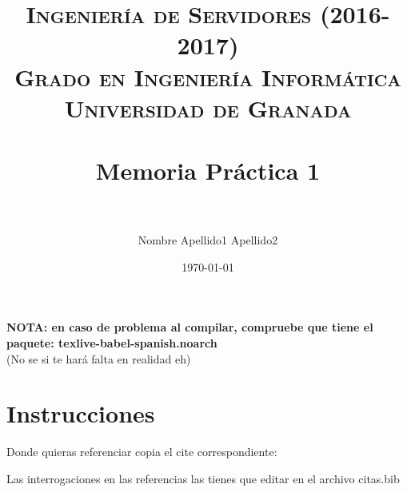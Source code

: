 


\title{	
\normalfont \normalsize 
\textsc{\textbf{Ingeniería de Servidores (2016-2017)} \\ Grado en Ingeniería Informática \\ Universidad de Granada} \\ [25pt] %
\horrule{0.5pt} \\[0.4cm] %
\huge Memoria Práctica 1 \\ %
\horrule{2pt} \\[0.5cm] %
}

\author{Nombre Apellido1 Apellido2} %

\date{\normalsize\today} %





\newpage

\textbf{NOTA: en caso de problema al compilar, compruebe que tiene el paquete: texlive-babel-spanish.noarch }  \\
(No se si te hará falta en realidad eh)


\section{Instrucciones}

Donde quieras referenciar copia el cite correspondiente: \cite{kernel-doc}\cite{stalling}\cite{carretero}\cite{diapo}\cite{politecnica}\cite{silberschatz}\cite{trento}

Las interrogaciones en las referencias las tienes que editar en el archivo citas.bib



